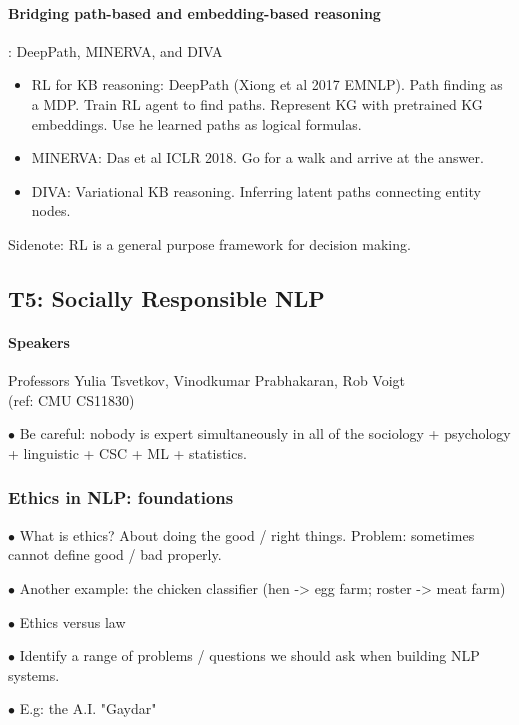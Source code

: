 \paragraph{Bridging path-based and embedding-based reasoning}: DeepPath, MINERVA, and DIVA\\
\begin{itemize}
	\item RL for KB reasoning: DeepPath (Xiong et al 2017 EMNLP). Path finding as a MDP. Train RL agent to find paths. Represent KG with pretrained KG embeddings. Use he learned paths as logical formulas.
	\item MINERVA: Das et al ICLR 2018. Go for a walk and arrive at the answer.
	\item DIVA: Variational KB reasoning. Inferring latent paths connecting entity nodes.
\end{itemize}

Sidenote: RL is a general purpose framework for decision making. 



\subsection{T5: Socially Responsible NLP}
\paragraph{Speakers} Professors Yulia Tsvetkov, Vinodkumar Prabhakaran, Rob Voigt \\
(ref: CMU CS11830)

$\bullet$ Be careful: nobody is expert simultaneously in all of the sociology + psychology + linguistic + CSC + ML + statistics. 

\subsubsection{Ethics in NLP: foundations}

$\bullet$ What is ethics? About doing the good / right things. Problem: sometimes cannot define good / bad properly. 

$\bullet$ Another example: the chicken classifier (hen -> egg farm; roster -> meat farm)

$\bullet$ Ethics versus law

$\bullet$ Identify a range of problems / questions we should ask when building NLP systems.

$\bullet$ E.g: the A.I. "Gaydar"

